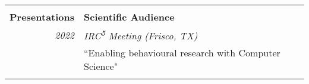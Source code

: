 \documentclass{article}
\begin{document}
\begin{longtable}{r | p{13cm}}
											\hline \\
											
		\large\textbf{Presentations}		& \large\textbf{Scientific Audience} \\
		\large\textit{2022}					& \large\textit{IRC\textsuperscript{5} Meeting (Frisco, TX)} \\
											& ``Enabling behavioural research with Computer Science" \\	
											& \\

											\hline
%
%
	\end{longtable}
\end{document}
